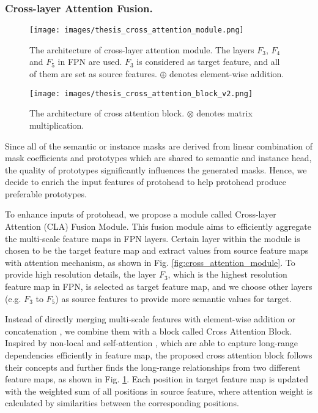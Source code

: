 \documentclass[runningheads]{llncs}
\begin{document}
\subsubsection{Cross-layer Attention Fusion.}
\begin{figure}[!tb]
    \begin{minipage}{.5\textwidth}
    \centering
      \texttt{[image: images/thesis\_cross\_attention\_module.png]}
      \caption{The architecture of cross-layer attention module. The layers $F_3$, $F_4$ and $F_5$ in FPN are used. $F_3$ is considered as target feature, and all of them are set as source features. $\oplus$ denotes element-wise addition. }
      \label{fig:cross_attention_module}
      \centering
    \end{minipage}
    \hspace{.05\textwidth}
    \begin{minipage}{.4\textwidth}
    \centering
      \texttt{[image: images/thesis\_cross\_attention\_block\_v2.png]}
      \caption{The architecture of cross attention block. $\otimes$ denotes matrix multiplication. }
      \label{fig:cross_attention_block}
    \centering
    \end{minipage}
\end{figure}
Since all of the semantic or instance masks are derived from linear combination of mask coefficients and prototypes which are shared to semantic and instance head, the quality of prototypes significantly influences the generated masks. Hence, we decide to enrich the input features of protohead to help protohead produce preferable prototypes.

To enhance inputs of protohead, we propose a module called Cross-layer Attention (CLA) Fusion Module. This fusion module aims to efficiently aggregate the multi-scale feature maps in FPN layers. Certain layer within the module is chosen to be the target feature map and extract values from source feature maps with attention mechanism, as shown in Fig. \ref{fig:cross_attention_module}. To provide high resolution details, the layer $F_3$, which is the highest resolution feature map in FPN, is selected as target feature map, and we choose other layers (e.g. $F_3$ to $F_5$) as source features to provide more semantic values for target. 

Instead of directly merging multi-scale features with element-wise addition or concatenation \cite{Zhao2016,Xiong2019,Pang,Porzi2019a}, we combine them with a block called Cross Attention Block. Inspired by non-local \cite{Wang2018} and self-attention \cite{Zhang,Fu,Vaswani2017}, which are able to capture long-range dependencies efficiently in feature map, the proposed cross attention block follows their concepts and further finds the long-range relationships from two different feature maps, as shown in Fig. \ref{fig:cross_attention_block}. Each position in target feature map is updated with the weighted sum of all positions in source feature, where attention weight is calculated by similarities between the corresponding positions.
\end{document}
